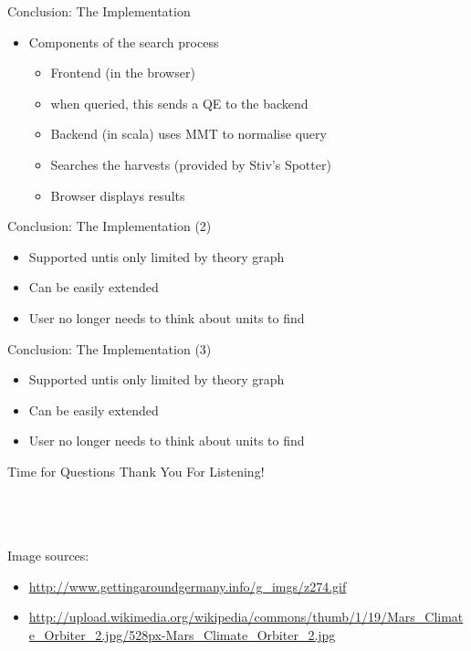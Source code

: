 \documentclass{beamer}
\begin{document}
  \begin{frame}{Conclusion: The Implementation}
    \begin{itemize}[<+->]
      \item Components of the search process
      \begin{itemize}
        \item Frontend (in the browser)
        \item when queried, this sends a QE to the backend
        \item Backend (in scala) uses MMT to normalise query
        \item Searches the harvests (provided by Stiv's Spotter)
        \item Browser displays results
      \end{itemize}
    \end{itemize}
  \end{frame}

  \begin{frame}{Conclusion: The Implementation (2)}
    \begin{itemize}[<+->]
      \item Supported untis only limited by theory graph
      \item Can be easily extended
      \item User no longer needs to think about units to find
    \end{itemize}
  \end{frame}

  \begin{frame}{Conclusion: The Implementation (3)}
    \begin{itemize}[<+->]
      \item Supported untis only limited by theory graph
      \item Can be easily extended
      \item User no longer needs to think about units to find
    \end{itemize}
  \end{frame}

  \begin{frame}{Time for Questions}
    \huge{Thank You For Listening!}
    \\\ \\\ \\\
    \tiny{
    Image sources: \\
      \begin{itemize}
        \item \url{http://www.gettingaroundgermany.info/g_imgs/z274.gif}
        \item \url{http://upload.wikimedia.org/wikipedia/commons/thumb/1/19/Mars_Climate_Orbiter_2.jpg/528px-Mars_Climate_Orbiter_2.jpg}
      \end{itemize}
    }

  \end{frame}

\end{document}
